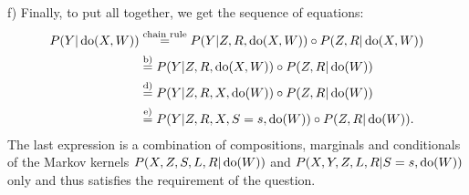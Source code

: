 {f)
Finally, to put all together, we get the sequence of equations:
\begin{align}
    P(Y|\operatorname{do}(X,W)) 
&\stackrel{\text{chain rule}}{=} P(Y|Z,R,\operatorname{do}(X,W)) \circ P(Z,R|\operatorname{do}(X,W)) \\
&\stackrel{\text{b)}}{=} P(Y|Z,R,\operatorname{do}(X,W)) \circ P(Z,R|\operatorname{do}(W)) \\
&\stackrel{\text{d)}}{=} P(Y|Z,R,X,\operatorname{do}(W)) \circ P(Z,R|\operatorname{do}(W)) \\
&\stackrel{\text{e)}}{=} P(Y|Z,R,X,S=s,\operatorname{do}(W)) \circ P(Z,R|\operatorname{do}(W)).
\end{align}
The last expression is a combination of compositions, marginals and conditionals of the Markov kernels $P(X,Z,S,L,R|\operatorname{do}(W))$ and $P(X,Y,Z,L,R|S=s,\operatorname{do}(W))$ only and thus satisfies the requirement of the question.


}
